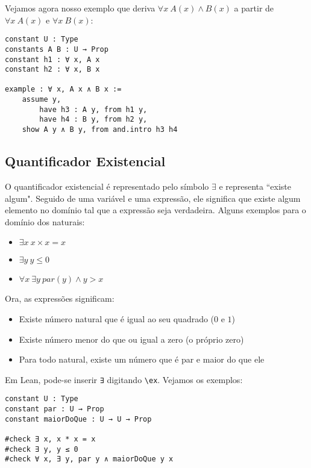         Vejamos agora nosso exemplo que deriva $\forall x \ A(x) \land B(x)$ a partir de $\forall x \ A(x)$ e $\forall x \ B(x)$:

        \begin{lstlisting}
constant U : Type
constants A B : U → Prop
constant h1 : ∀ x, A x
constant h2 : ∀ x, B x

example : ∀ x, A x ∧ B x :=
    assume y,
        have h3 : A y, from h1 y,
        have h4 : B y, from h2 y,
    show A y ∧ B y, from and.intro h3 h4
\end{lstlisting}

    \subsection{Quantificador Existencial}

        O quantificador existencial é representado pelo símbolo $\exists$ e representa ``existe algum".
        Seguido de uma variável e uma expressão, ele significa que existe algum elemento no domínio tal que a expressão seja verdadeira.
        Alguns exemplos para o domínio dos naturais:

        \begin{itemize}
            \item $\exists x \ x \times x = x$
            \item $\exists y \ y \le 0$
            \item $\forall x \ \exists y \ par(y) \land y > x$
        \end{itemize}

        Ora, as expressões significam:

        \begin{itemize}
            \item Existe número natural que é igual ao seu quadrado ($0$ e $1$)
            \item Existe número menor do que ou igual a zero (o próprio zero)
            \item Para todo natural, existe um número que é par e maior do que ele
        \end{itemize}

        Em Lean, pode-se inserir \lstinline{∃} digitando \lstinline{\ex}. Vejamos os exemplos:

        \begin{lstlisting}
constant U : Type
constant par : U → Prop
constant maiorDoQue : U → U → Prop

#check ∃ x, x * x = x
#check ∃ y, y ≤ 0
#check ∀ x, ∃ y, par y ∧ maiorDoQue y x
\end{lstlisting}

